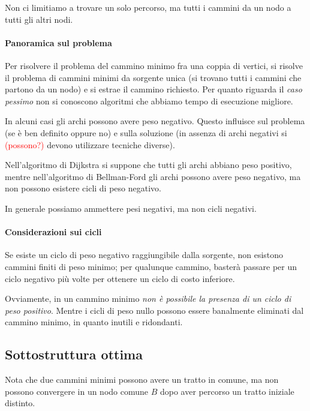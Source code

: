 \begin{note}
Non ci limitiamo a trovare un solo percorso, ma tutti i cammini da un nodo a tutti gli altri nodi.
\end{note}

\paragraph{Panoramica sul problema}

Per risolvere il problema del cammino minimo fra una coppia di vertici, si risolve il problema di cammini minimi da sorgente unica (si trovano tutti i cammini che partono da un nodo) e si estrae il cammino richiesto.
Per quanto riguarda il \emph{caso pessimo} non si conoscono algoritmi che abbiamo tempo di esecuzione migliore.

In alcuni casi gli archi possono avere peso negativo. Questo influisce sul problema (se è ben definito oppure no) e sulla soluzione (in assenza di archi negativi si \textcolor{red}{(possono?)} devono utilizzare tecniche diverse).

Nell'algoritmo di Dijkstra si suppone che tutti gli archi abbiano peso positivo, mentre nell'algoritmo di Bellman-Ford gli archi possono avere peso negativo, ma non possono esistere cicli di peso negativo.

\begin{note}
In generale possiamo ammettere pesi negativi, ma non cicli negativi.
\end{note}

\paragraph{Considerazioni sui cicli}
Se esiste un ciclo di peso negativo raggiungibile dalla sorgente, non esistono cammini finiti di peso minimo;
per qualunque cammino, basterà passare per un ciclo negativo più volte per ottenere un ciclo di costo inferiore.

Ovviamente, in un cammino minimo \emph{non è possibile la presenza di un ciclo di peso positivo}.
Mentre i cicli di peso nullo possono essere banalmente eliminati dal cammino minimo, in quanto inutili e ridondanti.

\subsection{Sottostruttura ottima}

Nota che due cammini minimi possono avere un tratto in comune, ma non possono convergere in un nodo comune \(B\) dopo aver percorso un tratto iniziale distinto.


